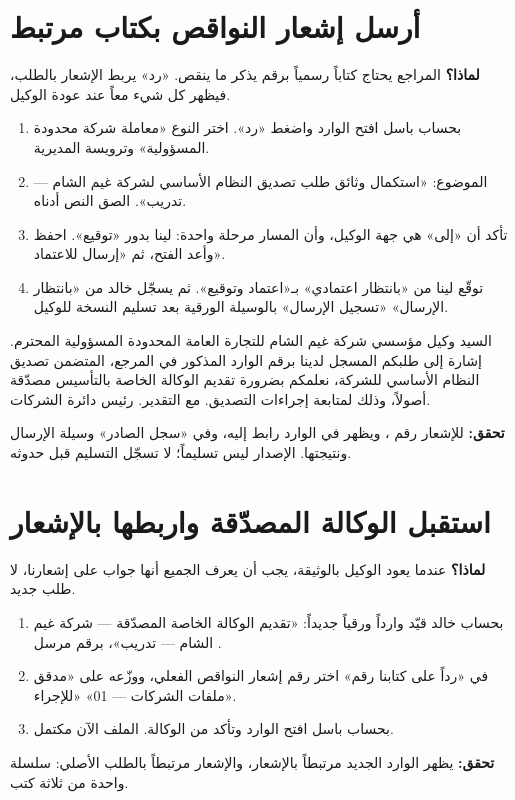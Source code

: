 \section{أرسل إشعار النواقص بكتاب مرتبط}
\label{sec:co-deficiency}
\textbf{لماذا؟} المراجع يحتاج كتاباً رسمياً برقم يذكر ما ينقص. «رد» يربط الإشعار بالطلب، فيظهر كل شيء معاً عند عودة الوكيل.
\begin{enumerate}
\item بحساب باسل افتح الوارد واضغط «رد». اختر النوع «معاملة شركة محدودة المسؤولية» وترويسة المديرية.
\item الموضوع: «استكمال وثائق طلب تصديق النظام الأساسي لشركة غيم الشام — تدريب». الصق النص أدناه.
\item تأكد أن «إلى» هي جهة الوكيل، وأن المسار مرحلة واحدة: لينا بدور «توقيع». احفظ وأعد الفتح، ثم «إرسال للاعتماد».
\item توقّع لينا من «بانتظار اعتمادي» بـ«اعتماد وتوقيع». ثم يسجّل خالد من «بانتظار الإرسال» «تسجيل الإرسال» بالوسيلة الورقية بعد تسليم النسخة للوكيل.
\end{enumerate}
\begin{rcnote}[نص الإشعار]
السيد وكيل مؤسسي شركة غيم الشام للتجارة العامة المحدودة المسؤولية المحترم. إشارة إلى طلبكم المسجل لدينا برقم الوارد المذكور في المرجع، المتضمن تصديق النظام الأساسي للشركة، نعلمكم بضرورة تقديم الوكالة الخاصة بالتأسيس مصدّقة أصولاً، وذلك لمتابعة إجراءات التصديق. مع التقدير. رئيس دائرة الشركات.
\end{rcnote}
\textbf{تحقق:} للإشعار رقم ، ويظهر في الوارد رابط إليه، وفي «سجل الصادر» وسيلة الإرسال ونتيجتها. الإصدار ليس تسليماً؛ لا تسجّل التسليم قبل حدوثه.

\section{استقبل الوكالة المصدّقة واربطها بالإشعار}
\label{sec:co-complete}
\textbf{لماذا؟} عندما يعود الوكيل بالوثيقة، يجب أن يعرف الجميع أنها جواب على إشعارنا، لا طلب جديد.
\begin{enumerate}
\item بحساب خالد قيّد وارداً ورقياً جديداً: «تقديم الوكالة الخاصة المصدّقة — شركة غيم الشام — تدريب»، برقم مرسل .
\item في «رداً على كتابنا رقم» اختر رقم إشعار النواقص الفعلي، ووزّعه على «مدقق ملفات الشركات — 01» «للإجراء».
\item بحساب باسل افتح الوارد وتأكد من الوكالة. الملف الآن مكتمل.
\end{enumerate}
\textbf{تحقق:} يظهر الوارد الجديد مرتبطاً بالإشعار، والإشعار مرتبطاً بالطلب الأصلي: سلسلة واحدة من ثلاثة كتب.

